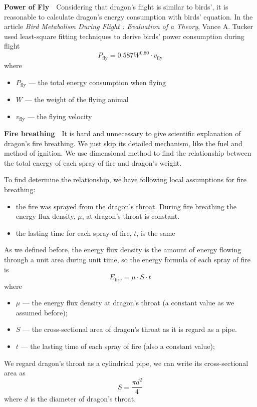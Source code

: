 \documentclass{mcmthesis}
\newcommand{\upcite}[1]{\textsuperscript{\textsuperscript{\cite{#1}}}}
\begin{document}
\textbf{Power of Fly}~~Considering that dragon’s flight is similar to birds', it is reasonable to calculate dragon’s energy consumption with birds' equation. In the article \textit{Bird Metabolism During Flight : Evaluation of a Theory}\upcite{tucker1973bird}, Vance A. Tucker used least-square fitting techniques to derive birds' power consumption during flight
\begin{equation}
\label{Pfly}
P_{\text{fly}}=0.587W^{0.80}\cdot v_{\text{fly}}
\end{equation}
where\begin{itemize}
\item $P_{\text{fly}}$ --- the total energy consumption when flying
\item $W$ --- the weight of the flying animal
\item $v_{\text{fly}}$ --- the flying velocity
\end{itemize}

\textbf{Fire breathing}~~It is hard and unnecessary to give scientific explanation of dragon's fire breathing. We just skip its detailed mechanism, like the fuel and method of ignition. We use dimensional method to find the relationship between the total energy of each spray of fire and dragon’s weight.

To find determine the relationship, we have following local assumptions for fire breathing:
\begin{itemize}
\item the fire was sprayed from the dragon's throat. During fire breathing the energy flux density, $\mu$, at dragon's throat is constant.
\item the lasting time for each spray of fire, $t$, is the same
\end{itemize}

As we defined before, the energy flux density is the amount of energy flowing through a unit area during unit time, so the energy formula of each spray of fire is
\begin{equation}
\label{fire energy formula}
E_{\text{fire}}=\mu\cdot{S}\cdot t
\end{equation}
where\begin{itemize}
\item $\mu$ --- the energy flux density at dragon's throat (a constant value as we assumed before);
\item $S$ --- the cross-sectional area of dragon's throat as it is regard as a pipe.
\item $t$ --- the lasting time of each spray of fire (also a constant value);
\end{itemize}
We regard dragon's throat as a cylindrical pipe, we can write its cross-sectional area as
\begin{equation}
\label{S}
S=\frac{\pi d^2}{4}%
\end{equation}
where $d$ is the diameter of dragon's throat.
\end{document}
